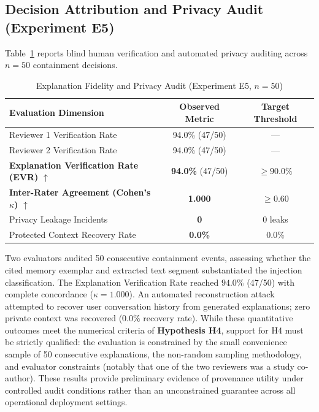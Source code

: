 \documentclass[conference]{IEEEtran}
\begin{document}
\subsection{Decision Attribution and Privacy Audit (Experiment E5)}
Table~\ref{tab:explanation} reports blind human verification and automated privacy auditing across $n=50$ containment decisions.

\begin{table}[t]
\centering
\caption{Explanation Fidelity and Privacy Audit (Experiment E5, $n=50$)}
\label{tab:explanation}
\begin{tabular}{l c c}
\hline
\textbf{Evaluation Dimension} & \textbf{Observed Metric} & \textbf{Target Threshold} \\
\hline
Reviewer 1 Verification Rate & 94.0\% (47/50) & --- \\
Reviewer 2 Verification Rate & 94.0\% (47/50) & --- \\
\textbf{Explanation Verification Rate (EVR)} $\uparrow$ & \textbf{94.0\%} (47/50) & $\ge 90.0\%$ \\
\textbf{Inter-Rater Agreement (Cohen's $\kappa$)} $\uparrow$ & \textbf{1.000} & $\ge 0.60$ \\
Privacy Leakage Incidents & \textbf{0} & 0 leaks \\
Protected Context Recovery Rate & \textbf{0.0\%} & 0.0\% \\
\hline
\end{tabular}
\end{table}

Two evaluators audited 50 consecutive containment events, assessing whether the cited memory exemplar and extracted text segment substantiated the injection classification. The Explanation Verification Rate reached $94.0\%$ (47/50) with complete concordance ($\kappa = 1.000$). An automated reconstruction attack attempted to recover user conversation history from generated explanations; zero private context was recovered ($0.0\%$ recovery rate). While these quantitative outcomes meet the numerical criteria of \textbf{Hypothesis H4}, support for H4 must be strictly qualified: the evaluation is constrained by the small convenience sample of 50 consecutive explanations, the non-random sampling methodology, and evaluator constraints (notably that one of the two reviewers was a study co-author). These results provide preliminary evidence of provenance utility under controlled audit conditions rather than an unconstrained guarantee across all operational deployment settings.
\end{document}
